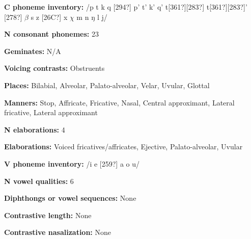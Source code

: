 \begin{styleBody}
\textbf{C phoneme inventory:} /p t k q [294?] p’ t’ k’ q’ t[361?][283?] t[361?][283?]’ [278?] $\beta $ s z [26C?] x $\chi $ m n ŋ l j/
\end{styleBody}

\begin{styleBody}
\textbf{N consonant phonemes:} 23
\end{styleBody}

\begin{styleBody}
\textbf{Geminates:} N/A
\end{styleBody}

\begin{styleBody}
\textbf{Voicing contrasts:} Obstruents
\end{styleBody}

\begin{styleBody}
\textbf{Places:} Bilabial, Alveolar, Palato-alveolar, Velar, Uvular, Glottal
\end{styleBody}

\begin{styleBody}
\textbf{Manners:} Stop, Affricate, Fricative, Nasal, Central approximant, Lateral fricative, Lateral approximant
\end{styleBody}

\begin{styleBody}
\textbf{N elaborations:} 4
\end{styleBody}

\begin{styleBody}
\textbf{Elaborations:} Voiced fricatives/affricates, Ejective, Palato-alveolar, Uvular
\end{styleBody}

\begin{styleBody}
\textbf{V phoneme inventory:} /i e [259?] a o u/
\end{styleBody}

\begin{styleBody}
\textbf{N vowel qualities:} 6
\end{styleBody}

\begin{styleBody}
\textbf{Diphthongs or vowel sequences:} None
\end{styleBody}

\begin{styleBody}
\textbf{Contrastive length:} None
\end{styleBody}

\begin{styleBody}
\textbf{Contrastive nasalization:} None
\end{styleBody}

